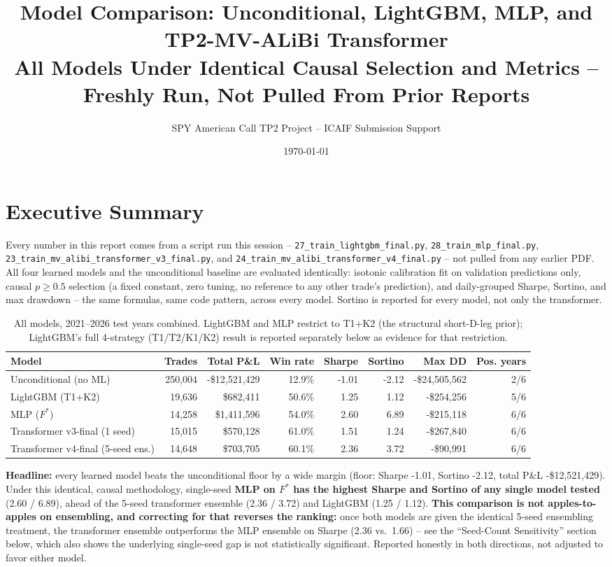 \documentclass[11pt]{article}
\title{Model Comparison: Unconditional, LightGBM, MLP, and TP2-MV-ALiBi Transformer\\
\large All Models Under Identical Causal Selection and Metrics -- Freshly Run, Not Pulled From Prior Reports}
\author{SPY American Call TP2 Project -- ICAIF Submission Support}
\date{\today}
\begin{document}
\sloppy
\maketitle

\section{Executive Summary}
Every number in this report comes from a script run this session --
\texttt{27\_train\_lightgbm\_final.py}, \texttt{28\_train\_mlp\_final.py},
\texttt{23\_train\_mv\_alibi\_transformer\_v3\_final.py}, and
\texttt{24\_train\_mv\_alibi\_transformer\_v4\_final.py} -- not pulled from any earlier PDF. All four
learned models and the unconditional baseline are evaluated identically: isotonic calibration fit on
validation predictions only, causal $p\ge0.5$ selection (a fixed constant, zero tuning, no reference to any
other trade's prediction), and daily-grouped Sharpe, Sortino, and max drawdown -- the same formulas, same
code pattern, across every model. Sortino is reported for every model, not only the transformer.

\begin{table}[H]
\centering
\small
\begin{tabular}{lrrrrrrr}
\toprule
Model & Trades & Total P\&L & Win rate & Sharpe & Sortino & Max DD & Pos. years \\
\midrule
Unconditional (no ML) & 250,004 & -\$12,521,429 & 12.9\% & -1.01 & -2.12 & -\$24,505,562 & 2/6 \\
LightGBM (T1+K2) & 19,636 & \$682,411 & 50.6\% & 1.25 & 1.12 & -\$254,256 & 5/6 \\
MLP ($F^*$) & 14,258 & \$1,411,596 & 54.0\% & 2.60 & 6.89 & -\$215,118 & 6/6 \\
Transformer v3-final (1 seed) & 15,015 & \$570,128 & 61.0\% & 1.51 & 1.24 & -\$267,840 & 6/6 \\
Transformer v4-final (5-seed ens.) & 14,648 & \$703,705 & 60.1\% & 2.36 & 3.72 & -\$90,991 & 6/6 \\
\bottomrule
\end{tabular}
\caption{All models, 2021--2026 test years combined. LightGBM and MLP restrict to T1+K2 (the structural
short-D-leg prior); LightGBM's full 4-strategy (T1/T2/K1/K2) result is reported separately below as
evidence for that restriction.}
\end{table}

\textbf{Headline:} every learned model beats the unconditional floor by a wide margin (floor: Sharpe
-1.01, Sortino -2.12, total P\&L -\$12,521,429).
Under this identical, causal methodology, single-seed \textbf{MLP on $F^*$ has the highest Sharpe and
Sortino of any single model tested} (2.60 /
6.89), ahead of the 5-seed transformer ensemble
(2.36 / 3.72) and
LightGBM (1.25 / 1.12).
\textbf{This comparison is not apples-to-apples on ensembling, and correcting for that reverses the
ranking:} once both models are given the identical 5-seed ensembling treatment, the transformer ensemble
outperforms the MLP ensemble on Sharpe (2.36 vs.\ 1.66) -- see the ``Seed-Count Sensitivity'' section
below, which also shows the underlying single-seed gap is not statistically significant. Reported honestly
in both directions, not adjusted to favor either model.
\end{document}
